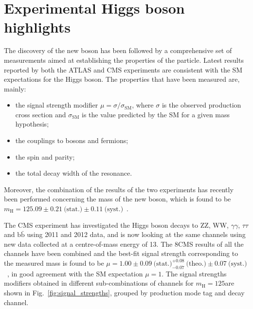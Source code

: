\section{Experimental Higgs boson highlights}
\label{sec:HiggsExp}

The discovery of the new boson has been followed by a comprehensive set of measurements aimed at establishing the properties of the particle. Latest results reported by both the ATLAS and CMS experiments are consistent with the SM expectations for the Higgs boson. The properties that have been measured are, mainly:

\begin{itemize}
\item the signal strength modifier $\mu = \sigma/\sigma_\mathrm{SM}$, where $\sigma$ is the observed production cross section and $\sigma_\mathrm{SM}$ is the value predicted by the SM for a given mass hypothesis;

\item the couplings to bosons and fermions;

\item the spin and parity;

\item the total decay width of the resonance.
\end{itemize}

Moreover, the combination of the results of the two experiments has recently been performed concerning the mass of the new boson, which is found to be $m_\mathrm{H} = 125.09 \pm 0.21 ~\text{(stat.)} \pm 0.11~\text{(syst.)}$\GeV~\cite{Aad:2015zhl}.

The CMS experiment has investigated the Higgs boson decays to ZZ, WW, $\gamma\gamma$, $\tau\tau$ and $\mathrm{b \bar b}$ using 2011 and 2012 data, and is now looking at the same channels using new data collected at a centre-of-mass energy of 13\TeV. The 8\TeV CMS results of all the channels have been combined and the best-fit signal strength corresponding to the measured mass is found to be $\mu = 1.00 \pm 0.09~\text{(stat.)} ^{+0.08}_{-0.07}~\text{(theo.)} \pm  0.07~\text{(syst.)}$~\cite{Khachatryan:2014jba}, in good agreement with the SM expectation $\mu=1$.
The signal strengths modifiers obtained in different sub-combinations of channels for $m_\mathrm{H}=125$\GeV are shown in Fig.~\ref{fig:signal_strengths}, grouped by production mode tag and decay channel.

